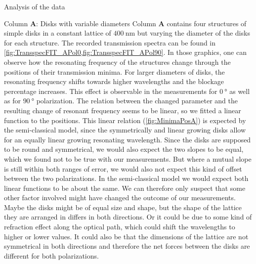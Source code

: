 \documentclass[pdftex, a4paper,11pt, twoside, UKenglish]{report}
\begin{document}
\begin{chapter}{Analysis of the data}
    \begin{section}{Column \textbf{A}: Disks with variable diameters}
      \label{chp:DataA}
      Column \textbf{A} contains four structures of simple disks in a constant
      lattice of $\SI{400}{\nano\meter}$ but varying the diameter of the disks
      for each structure. The recorded transmission spectra can be found in
      \cref{fig:TransspecFIT_APol0,fig:TransspecFIT_APol90}.
      In those graphics, one can observe how the resonating frequency of the
      structures change through the positions of their transmission minima.
      For larger diameters of disks, the resonating frequency shifts towards
      higher wavelengths and the blockage percentage increases.
      This effect is observable in the measurements for $\SI{0}{\degree}$ as
      well as for $\SI{90}{\degree}$ polarization. The relation between the
      changed parameter and the resulting change of resonant frequency seems to
      be linear, so we fitted a linear function to the positions.
      This linear relation (\cref{fig:MinimaPosA}) is expected by the
      semi-classical model, since the symmetrically and linear growing disks
      allow for an equally linear growing resonating wavelength. Since the
      disks are supposed to be round and symmetrical, we would also expect the
      two slopes to be equal, which we found not to be true with our
      measurements. But where a mutual slope is still within both ranges of
      error, we would also not expect this kind of offset between the two
      polarizations. In the semi-classical model we would expect both linear
      functions to be about the same. We can therefore only suspect that
      some other factor involved might have changed the outcome of our
      measurements. Maybe the disks might be of equal size and shape, but the
      shape of the lattice they are arranged in differs in both directions.
      Or it could be due to some kind of refraction effect along the optical
      path, which could shift the wavelengths to higher or lower values.
      It could also be that the dimensions of the lattice are not symmetrical
      in both directions and therefore the net forces between the disks are
      different for both polarizations.
      

\end{section}
\end{chapter}
\end{document}
